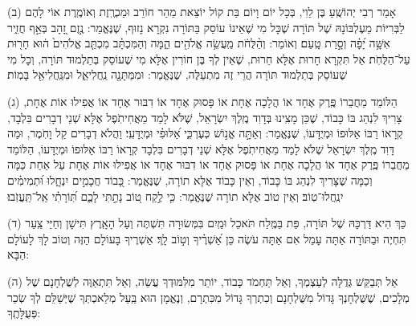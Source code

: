 \documentclass[twoside, openany, parskip=half, 11pt]{book}
\begin{document}
(ב)
 אָמַר רְבִי יְהוֹשֻֽׁעַ בֶּן לֵוִי, בְּכָל יוֹם וָיוֹם בַּת קוֹל יוֹצֵאת מֵהַר חוֹרֵב וּמַכְרֶֽזֶת וְאוֹמֶֽרֶת אוֹי לָהֶם לַבְּרִיּוֹת מֵעֶלְבּוֹנָהּ שֶׁל תּוֹרָה שֶׁכָּל מִי שֶׁאֵינוֹ עוֹסֵק בַּתּוֹרָה נִקְרָא נָזוּף, שֶׁנֶּאֱמַר: נֶ֣זֶם זָ֭הָב בְּאַ֣ף חֲזִ֑יר אִשָּׁ֥ה יָ֝פָ֗ה וְסָ֣רַת טָֽעַם׃ וְאוֹמֵר: וְהַ֨לֻּחֹ֔ת מַֽעֲשֵׂ֥ה אֱלֹהִ֖ים הֵ֑מָּה וְהַמִּכְתָּ֗ב מִכְתַּ֤ב אֱלֹהִים֙ ה֔וּא חָר֖וּת עַל־הַלֻּחֹֽת׃ אַל תִּקְרָא חָרוּת אֶלָּא חֵרוּת, שֶׁאֵין לְךָ בֶּן חוֹרִין אֶלָּא מִי שֶׁעוֹסֵק בְּתַלְמוּד תּוֹרָה, וְכָל מִי שֶׁעוֹסֵק בְּתַלְמוּד תּוֹרָה הֲרֵי זֶה מִתְעַלֶּה, שֶׁנֶּאֱמַר: וּמִמַּתָּנָ֖ה נַֽחֲלִיאֵ֑ל וּמִנַּֽחֲלִיאֵ֖ל בָּמֽוֹת׃

(ג)
 הַלּוֹמֵד מֵחֲבֵרוֹ פֶּֽרֶק אֶחָד אוֹ הֲלָכָה אֶחָת אוֹ פָּסוּק אֶחָד אוֹ דִבּוּר אֶחָד אוֹ אֲפִילוּ אוֹת אֶחָת, צָרִיךְ לִנְהַג בּוֹ כָּבוֹד, שֶׁכֵּן מָצִֽינוּ בְּדָוִד מֶֽלֶךְ יִשְׂרָאֵל, שֶׁלֹּא לָמַד מֵאֲחִיתֹֽפֶל אֶלָּא שְׁנֵי דְבָרִים בִּלְבָד, קְרָאוֹ רַבּוֹ אַלּוּפוֹ וּמְיֻדָּעוֹ,               שֶׁנֶּאֱמַר:  וְאַתָּ֣ה אֱנ֣וֹשׁ כְּעֶרְכִּ֑י אַ֝לּוּפִ֗י וּמְיֻדָּעִֽי׃ וַהֲלֹא דְבָרִים קַל וָחֹֽמֶר, וּמַה דָּוִד מֶֽלֶךְ יִשְׂרָאֵל שֶׁלֹּא לָמַד מֵאֲחִיתֹֽפֶל אֶלָּא שְׁנֵי דְבָרִים בִּלְבָד קְרָאוֹ רַבּוֹ אַלּוּפוֹ וּמְיֻדָּעוֹ, הַלּוֹמֵד מֵחֲבֵרוֹ פֶּֽרֶק אֶחָד אוֹ הֲלָכָה אֶחָת אוֹ פָּסוּק אֶחָד אוֹ דִבּוּר אֶחָד אוֹ אֲפִילוּ אוֹת אֶחָת עַל אַחַת כַּמָּה וְכַמָּה שֶׁצָּרִיךְ לִנְהַג בּוֹ כָּבוֹד, וְאֵין כָּבוֹד אֶלָּא תוֹרָה, שֶׁנֶּאֱמַר: כָּ֭בוֹד חֲכָמִ֣ים יִנְחָ֑לוּ  וּ֝תְמִימִ֗ים יִנְֽחֲלוּ־טֽוֹב׃ וְאֵין טוֹב אֶלָּא תוֹרָה שֶׁנֶּאֱמַר: כִּ֤י לֶ֣קַח ט֭וֹב נָתַ֣תִּי לָכֶ֑ם תּֽ֝וֹרָתִ֗י אַֽל־תַּֽעֲזֹֽבוּ׃

(ד)
 כַּךְ הִיא דַּרְכָּהּ שֶׁל תּוֹרָה, פַּת בַּמֶּֽלַח תֹּאכֵל וּמַֽיִם בִּמְּשׂוּרָה תִּשְׁתֶּה וְעַל הָאָֽרֶץ תִּישָׁן וְחַיֵּי צַֽעַר תִּחְיֶה וּבַתּוֹרָה אַתָּה עָמֵל אִם אַתָּה עֹשֶׂה כֵּן אַ֝שְׁרֶ֗יךָ וְט֣וֹב לָֽךְ׃ אַשְׁרֶיךָ בָּעוֹלָם הַזֶּה וְטוֹב לָךְ לָעוֹלָם הַבָּא: 

(ה)
 אַל תְּבַקֵּשׁ גְּדֻלָּה לְעַצְמְךָ, וְאַל תַּחְמֹד כָּבוֹד, יוֹתֵר מִלִּמּוּדְךָ עֲשֵׂה, וְאַל תִּתְאַוֶּה לְשֻׁלְחָנָם שֶׁל מְלָכִים, שֶׁשֻּׁלְחָנְךָ גָּדוֹל מִשֻּׁלְחָנָם וְכִתְרְךָ גָּדוֹל מִכִּתְרָם, וְנֶאֱמָן הוּא בַּֽעַל מְלַאכְתְּךָ שֶׁיְּשַׁלֵּם לְךָ שְׂכַר פְּעֻלָּתֶֽךָ: 
\end{document}
